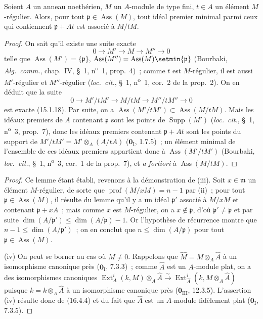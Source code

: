 \begin{lemma}[16.4.6.3]
\label{0.16.4.6.3-fr}
Soient $A$ un anneau noethérien, $M$ un $A$-module de type fini, $t\in A$ un
élément $M$-régulier. Alors, pour tout
$\mathfrak{p}\in\operatorname{Ass}(M)$, tout idéal premier minimal parmi ceux
qui contiennent $\mathfrak{p}+At$ est associé à $M/tM$.
\end{lemma}

\begin{proof}
On sait qu'il existe une suite exacte
\[
  0\to M'\to M\to M''\to0
\]
telle que $\operatorname{Ass}(M')=\{\mathfrak{p}\}$,
$\operatorname{Ass}(M'')=\operatorname{Ass}(M)\setmin\{\mathfrak{p}\}$ (Bourbaki,
\emph{Alg.~comm.}, chap.~IV, \S~1, n\textsuperscript{o}~1, prop.~4)~; comme $t$ est
$M$-régulier, il est aussi $M'$-régulier et $M''$-régulier
(\emph{loc.~cit.}, \S~1, n\textsuperscript{o}~1, cor.~2 de la prop.~2). On en déduit que la
suite
\[
  0\to M'/tM'\to M/tM\to M''/tM''\to0
\]
est exacte (15.1.18). Par suite, on a
$\operatorname{Ass}(M'/tM')\subset\operatorname{Ass}(M/tM)$. Mais les idéaux
premiers de $A$ contenant $\mathfrak{p}$ sont les points de
$\operatorname{Supp}(M')$ (\emph{loc.~cit.}, \S~1, n\textsuperscript{o}~3, prop.~7), donc les
idéaux premiers contenant $\mathfrak{p}+At$ sont les points du support de
$M'/tM'=M'\otimes_A(A/tA)$ ($\mathbf{0}_{\mathrm I}$, 1.7.5)~; un élément minimal de
l'ensemble de ces idéaux premiers appartient donc à
$\operatorname{Ass}(M'/tM')$ (Bourbaki, \emph{loc.~cit.}, \S~1, n\textsuperscript{o}~3,
cor.~1 de la prop.~7), et \emph{a fortiori} à
$\operatorname{Ass}(M/tM)$.
\end{proof}

\begin{proof}
Ce lemme étant établi, revenons à la démonstration de (iii). Soit
$x\in\mathfrak{m}$ un élément $M$-régulier, de sorte que
$\operatorname{prof}(M/xM)=n-1$ par (ii)~; pour tout
$\mathfrak{p}\in\operatorname{Ass}(M)$, il résulte du lemme qu'il y a un idéal
$\mathfrak{p}'$ associé à $M/xM$ et contenant $\mathfrak{p}+xA$~; mais comme
$x$ est $M$-régulier, on a $x\notin\mathfrak{p}$, d'où
$\mathfrak{p}'\neq\mathfrak{p}$ et par suite
$\dim(A/\mathfrak{p}')\leq\dim(A/\mathfrak{p})-1$. Or l'hypothèse de
récurrence montre que $n-1\leq\dim(A/\mathfrak{p}')$~; on en conclut que
$n\leq\dim(A/\mathfrak{p})$ pour tout
$\mathfrak{p}\in\operatorname{Ass}(M)$.

(iv) On peut se borner au cas où $M\neq0$. Rappelons que
$\widehat{M}=M\otimes_A\widehat{A}$ à un isomorphisme canonique près
($\mathbf{0}_{\mathrm I}$, 7.3.3)~; comme $\widehat{A}$ est un $A$-module plat, on a des
isomorphismes canoniques
$\operatorname{Ext}^i_A(k,M)\otimes_A\widehat{A}\xrightarrow{\sim}\operatorname{Ext}^i_{\widehat{A}}(k,M\otimes_A\widehat{A})$
puisque $k=k\otimes_A\widehat{A}$ à un isomorphisme canonique près
($\mathbf{0}_{\mathrm{III}}$, 12.3.5). L'assertion (iv) résulte donc de (16.4.4) et du
fait que $\widehat{A}$ est un $A$-module fidèlement plat
($\mathbf{0}_{\mathrm I}$, 7.3.5).
\end{proof}


